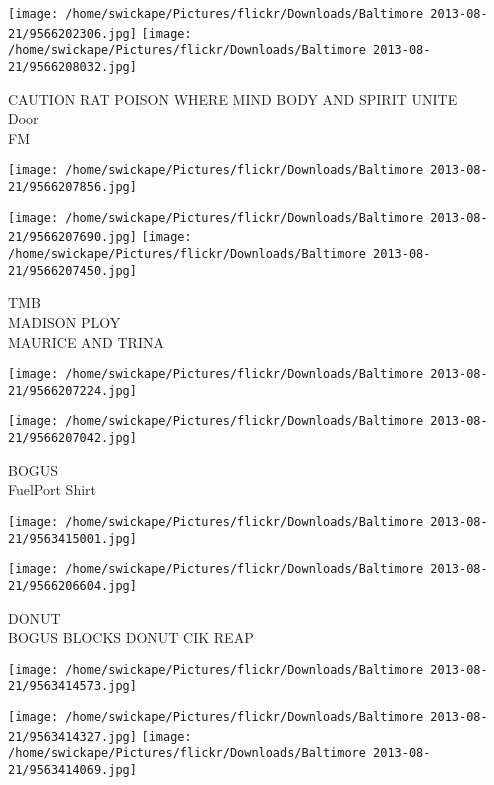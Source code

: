 \documentclass[10pt,letterpaper]{article}
\begin{document}
\vspace{0.25in}
\texttt{[image: /home/swickape/Pictures/flickr/Downloads/Baltimore 2013-08-21/9566202306.jpg]}
\texttt{[image: /home/swickape/Pictures/flickr/Downloads/Baltimore 2013-08-21/9566208032.jpg]}

CAUTION RAT POISON WHERE MIND BODY AND SPIRIT UNITE\\
Door\\
FM
\pagebreak

\texttt{[image: /home/swickape/Pictures/flickr/Downloads/Baltimore 2013-08-21/9566207856.jpg]}

\vspace{0.25in}
\texttt{[image: /home/swickape/Pictures/flickr/Downloads/Baltimore 2013-08-21/9566207690.jpg]}
\texttt{[image: /home/swickape/Pictures/flickr/Downloads/Baltimore 2013-08-21/9566207450.jpg]}

TMB\\
MADISON PLOY\\
MAURICE AND TRINA
\pagebreak

\texttt{[image: /home/swickape/Pictures/flickr/Downloads/Baltimore 2013-08-21/9566207224.jpg]}

\vspace{0.25in}
\texttt{[image: /home/swickape/Pictures/flickr/Downloads/Baltimore 2013-08-21/9566207042.jpg]}

BOGUS\\
FuelPort Shirt
\pagebreak

\texttt{[image: /home/swickape/Pictures/flickr/Downloads/Baltimore 2013-08-21/9563415001.jpg]}

\vspace{0.25in}
\texttt{[image: /home/swickape/Pictures/flickr/Downloads/Baltimore 2013-08-21/9566206604.jpg]}

DONUT\\
BOGUS BLOCKS DONUT CIK REAP
\pagebreak

\texttt{[image: /home/swickape/Pictures/flickr/Downloads/Baltimore 2013-08-21/9563414573.jpg]}

\vspace{0.25in}
\texttt{[image: /home/swickape/Pictures/flickr/Downloads/Baltimore 2013-08-21/9563414327.jpg]}
\texttt{[image: /home/swickape/Pictures/flickr/Downloads/Baltimore 2013-08-21/9563414069.jpg]}
\end{document}

